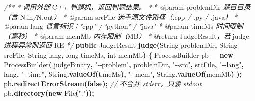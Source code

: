 \documentclass[
  11pt,
]{ctexart}
\newenvironment{Shaded}{\begin{snugshade}}{\end{snugshade}}
\newcommand{\BuiltInTok}[1]{#1}
\newcommand{\CommentTok}[1]{\textcolor[rgb]{0.56,0.35,0.01}{\textit{#1}}}
\newcommand{\DataTypeTok}[1]{\textcolor[rgb]{0.13,0.29,0.53}{#1}}
\newcommand{\FunctionTok}[1]{\textcolor[rgb]{0.13,0.29,0.53}{\textbf{#1}}}
\newcommand{\KeywordTok}[1]{\textcolor[rgb]{0.13,0.29,0.53}{\textbf{#1}}}
\newcommand{\NormalTok}[1]{#1}
\newcommand{\OperatorTok}[1]{\textcolor[rgb]{0.81,0.36,0.00}{\textbf{#1}}}
\newcommand{\StringTok}[1]{\textcolor[rgb]{0.31,0.60,0.02}{#1}}
\begin{document}
\begin{Shaded}
\begin{Highlighting}[]
    \CommentTok{/**}
     \CommentTok{*} \CommentTok{调用外部}\NormalTok{ C}\CommentTok{++} \CommentTok{判题机，返回判题结果。}
     \CommentTok{*}
\CommentTok{     * @}\NormalTok{param problemDir }\CommentTok{题目目录（含}\NormalTok{ N}\CommentTok{.}\NormalTok{in}\CommentTok{/}\NormalTok{N}\CommentTok{.}\NormalTok{out}\CommentTok{）}
     \CommentTok{*} \CommentTok{@}\NormalTok{param srcFile    }\CommentTok{选手源文件路径（.}\NormalTok{cpp }\CommentTok{/} \CommentTok{.}\NormalTok{py }\CommentTok{/} \CommentTok{.}\NormalTok{java}\CommentTok{）}
     \CommentTok{*} \CommentTok{@}\NormalTok{param lang       }\CommentTok{语言标识："}\NormalTok{cpp}\CommentTok{"} \CommentTok{/} \CommentTok{"}\NormalTok{python}\CommentTok{"} \CommentTok{/} \CommentTok{"}\NormalTok{java}\CommentTok{"}
     \CommentTok{*} \CommentTok{@}\NormalTok{param timeMs     }\CommentTok{时间限制（毫秒）}
     \CommentTok{*} \CommentTok{@}\NormalTok{param memMb      }\CommentTok{内存限制（}\NormalTok{MB}\CommentTok{）}
     \CommentTok{*} \CommentTok{@}\NormalTok{return JudgeResult}\CommentTok{，若}\NormalTok{ judge }\CommentTok{进程异常则返回}\NormalTok{ RE}
     \CommentTok{*/}
    \KeywordTok{public}\NormalTok{ JudgeResult }\FunctionTok{judge}\OperatorTok{(}\BuiltInTok{String}\NormalTok{ problemDir}\OperatorTok{,} \BuiltInTok{String}\NormalTok{ srcFile}\OperatorTok{,}
                             \BuiltInTok{String}\NormalTok{ lang}\OperatorTok{,} \DataTypeTok{long}\NormalTok{ timeMs}\OperatorTok{,} \DataTypeTok{int}\NormalTok{ memMb}\OperatorTok{)} \OperatorTok{\{}
        \BuiltInTok{ProcessBuilder}\NormalTok{ pb }\OperatorTok{=} \KeywordTok{new} \BuiltInTok{ProcessBuilder}\OperatorTok{(}
\NormalTok{            judgeBinary}\OperatorTok{,}
            \StringTok{"{-}{-}problem"}\OperatorTok{,}\NormalTok{ problemDir}\OperatorTok{,}
            \StringTok{"{-}{-}src"}\OperatorTok{,}\NormalTok{     srcFile}\OperatorTok{,}
            \StringTok{"{-}{-}lang"}\OperatorTok{,}\NormalTok{    lang}\OperatorTok{,}
            \StringTok{"{-}{-}time"}\OperatorTok{,}    \BuiltInTok{String}\OperatorTok{.}\FunctionTok{valueOf}\OperatorTok{(}\NormalTok{timeMs}\OperatorTok{),}
            \StringTok{"{-}{-}mem"}\OperatorTok{,}     \BuiltInTok{String}\OperatorTok{.}\FunctionTok{valueOf}\OperatorTok{(}\NormalTok{memMb}\OperatorTok{)}
        \OperatorTok{);}
\NormalTok{        pb}\OperatorTok{.}\FunctionTok{redirectErrorStream}\OperatorTok{(}\KeywordTok{false}\OperatorTok{);}  \CommentTok{// 不合并 stderr，只读 stdout}
\NormalTok{        pb}\OperatorTok{.}\FunctionTok{directory}\OperatorTok{(}\KeywordTok{new} \BuiltInTok{File}\OperatorTok{(}\StringTok{"."}\OperatorTok{));}


\end{Highlighting}
\end{Shaded}
\end{document}
